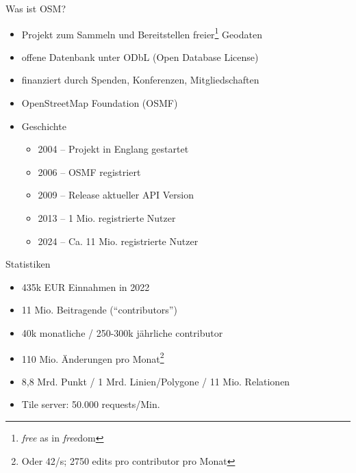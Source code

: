 \documentclass{beamer}
\begin{document}
			\begin{frame}{Was ist OSM?}
				\begin{itemize}
					\item Projekt zum Sammeln und Bereitstellen freier\footnote{\textit{free} as in \textit{free}dom} Geodaten
					\item offene Datenbank unter ODbL (Open Database License)\pause
					\item finanziert durch Spenden, Konferenzen, Mitgliedschaften
					\item OpenStreetMap Foundation (OSMF)\pause
					\item Geschichte
					\begin{itemize}
						\item 2004 -- Projekt in Englang gestartet
						\item 2006 -- OSMF registriert
						\item 2009 -- Release aktueller API Version
						\item 2013 -- 1 Mio. registrierte Nutzer
						\item 2024 -- Ca. 11 Mio. registrierte Nutzer
					\end{itemize}
				\end{itemize}
			\end{frame}
			
			\begin{frame}{Statistiken}
				\begin{itemize}
					\item 435k EUR Einnahmen in 2022
					\item 11 Mio. Beitragende (\enquote{contributors})
					\item 40k monatliche / 250-300k jährliche contributor
					\item 110 Mio. Änderungen pro Monat\footnote{Oder 42/s; 2750 edits pro contributor pro Monat}
					\item 8,8 Mrd. Punkt / 1 Mrd. Linien/Polygone / 11 Mio. Relationen
					\item Tile server: 50.000 requests/Min.
				\end{itemize}
			\end{frame}
\end{document}

